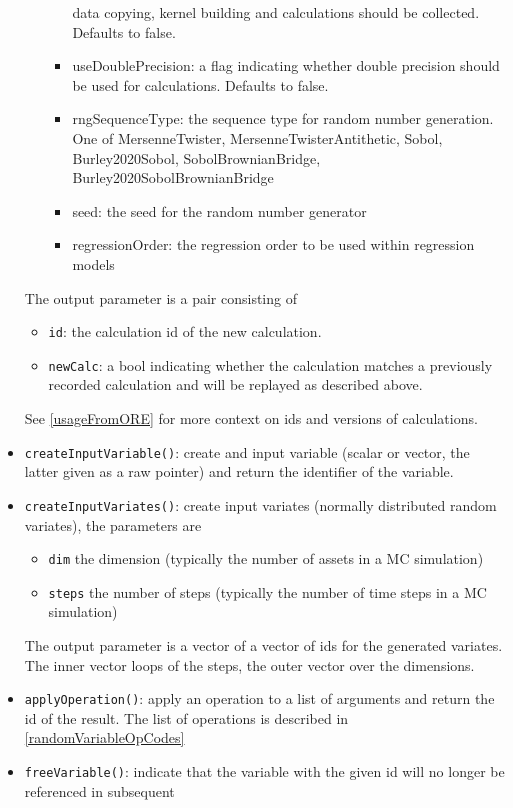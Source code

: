\documentclass[12pt, a4paper]{article}
\begin{document}
\begin{itemize}
\begin{itemize}
\begin{itemize}
    data copying, kernel building and calculations should be collected. Defaults to false.
      \item useDoublePrecision: a flag indicating whether double precision should be used for calculations. Defaults to
        false.
      \item rngSequenceType: the sequence type for random number generation. One of MersenneTwister,
        MersenneTwisterAntithetic, Sobol, Burley2020Sobol, SobolBrownianBridge, Burley2020SobolBrownianBridge
      \item seed: the seed for the random number generator
      \item regressionOrder: the regression order to be used within regression models
    \end{itemize}
  \end{itemize}
  The output parameter is a pair consisting of
  \begin{itemize}
  \item \verb+id+: the calculation id of the new calculation.
  \item \verb+newCalc+: a bool indicating whether the calculation matches a previously recorded calculation and will be
    replayed as described above.
  \end{itemize}
  See \ref{usageFromORE} for more context on ids and versions of calculations.
\item \verb+createInputVariable()+: create and input variable (scalar or vector, the latter given as a raw pointer) and
  return the identifier of the variable.
\item \verb+createInputVariates()+: create input variates (normally distributed random variates), the parameters are
  \begin{itemize}
  \item \verb+dim+ the dimension (typically the number of assets in a MC simulation)
  \item \verb+steps+ the number of steps (typically the number of time steps in a MC simulation)
  \end{itemize}
  The output parameter is a vector of a vector of ids for the generated variates. The inner vector loops of the steps,
  the outer vector over the dimensions.
\item \verb+applyOperation()+: apply an operation to a list of arguments and return the id of the result. The list of
  operations is described in \ref{randomVariableOpCodes}
\item \verb+freeVariable()+: indicate that the variable with the given id will no longer be referenced in subsequent

\end{itemize}
\end{document}
